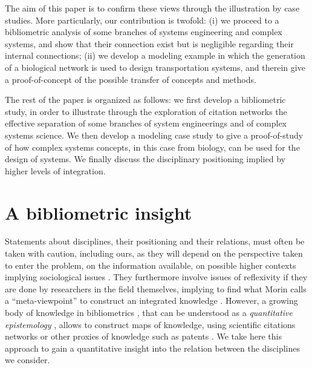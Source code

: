\documentclass[runningheads,a4paper]{llncs2e/llncs}
\begin{document}
The aim of this paper is to confirm these views through the illustration by case studies. More particularly, our contribution is twofold: (i) we proceed to a bibliometric analysis of some branches of systems engineering and complex systems, and show that their connection exist but is negligible regarding their internal connections; (ii) we develop a modeling example in which the generation of a biological network is used to design transportation systems, and therein give a proof-of-concept of the possible transfer of concepts and methods.


The rest of the paper is organized as follows: we first develop a bibliometric study, in order to illustrate through the exploration of citation networks the effective separation of some branches of system engineerings and of complex systems science. We then develop a modeling case study to give a proof-of-study of how complex systems concepts, in this case from biology, can be used for the design of systems. We finally discuss the disciplinary positioning implied by higher levels of integration.



\section{A bibliometric insight}


Statements about disciplines, their positioning and their relations, must often be taken with caution, including ours, as they will depend on the perspective taken to enter the problem, on the information available, on possible higher contexts implying sociological issues \cite{latour1977rhetorique}. They furthermore involve issues of reflexivity if they are done by researchers in the field themselves, implying to find what Morin calls a ``meta-viewpoint'' to construct an integrated knowledge \cite{edgar1986methode}. However, a growing body of knowledge in bibliometrics \cite{waltman2010unified}, that can be understood as a \emph{quantitative epistemology} \cite{chavalarias2013phylomemetic}, allows to construct maps of knowledge, using scientific citations networks or other proxies of knowledge such as patents \cite{bergeaud2017classifying}. We take here this approach to gain a quantitative insight into the relation between the disciplines we consider.
\end{document}
